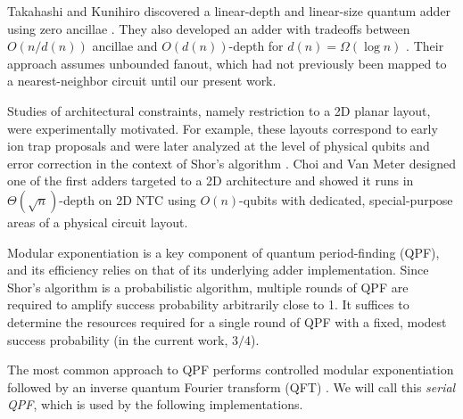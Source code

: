 \documentclass[twoside]{article}
\begin{document}
Takahashi and Kunihiro discovered a linear-depth
and linear-size quantum adder using zero ancillae \cite{Takahashi2005}.
They also developed an adder with tradeoffs between $O(n/d(n))$ ancillae and
$O(d(n))$-depth for $d(n) = \Omega(\log n)$ \cite{Takahashi2009}. 
Their approach assumes unbounded fanout, which had not previously been mapped to a
nearest-neighbor circuit until our present work.

Studies of architectural constraints, namely restriction to a 2D planar layout, 
were experimentally motivated. For example, these layouts correspond
to early ion trap proposals \cite{Kielpinski2002}
and were later analyzed at the level of physical qubits and error correction in the context of Shor's algorithm \cite{Kubi09}.
Choi and Van Meter designed one of the first adders targeted to a 2D architecture 
and showed it runs in $\Theta(\sqrt{n})$-depth on \textsc{2D NTC} \cite{Choi2010}
using $O(n)$-qubits with dedicated, special-purpose areas of a physical
circuit layout.

Modular exponentiation is a key component of quantum period-finding (QPF),
and its efficiency relies on that of its underlying adder implementation.
Since Shor's algorithm is a probabilistic algorithm, multiple rounds of
QPF are required to amplify success probability arbitrarily close to 1.
It suffices to determine the resources
required for a single round of QPF with a fixed, modest success probability
(in the current work, $3/4$).

The most common approach to QPF performs controlled
modular exponentiation followed by an inverse quantum Fourier transform
(QFT) \cite{Nielsen2000}. We will call this \emph{serial QPF}, which is
used by the following implementations.
\end{document}
